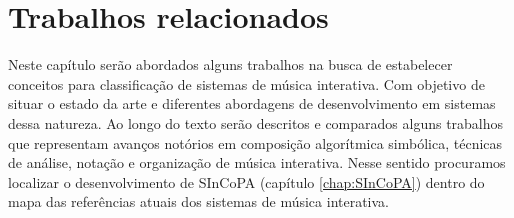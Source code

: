 \documentclass{ppgmus}
\begin{document}
% 
% 
% 
% 
% 
% 
% 
% 
% 
% 
% 
% 
% 
% 
% 
% 
% 
% 
% 







\chapter{Trabalhos relacionados}
\label{sec:rev}


Neste capítulo serão abordados alguns trabalhos na busca
de estabelecer conceitos para classificação de sistemas
de música interativa. Com objetivo de situar
o estado da arte e diferentes abordagens de desenvolvimento em sistemas dessa
natureza. Ao longo do texto serão descritos e comparados alguns trabalhos
que representam avanços notórios em composição algorítmica simbólica, 
técnicas de análise, notação e organização de música interativa.
Nesse sentido procuramos localizar o desenvolvimento de SInCoPA (capítulo \ref{chap:SInCoPA})
dentro do mapa das referências atuais dos sistemas de música interativa.
\end{document}
